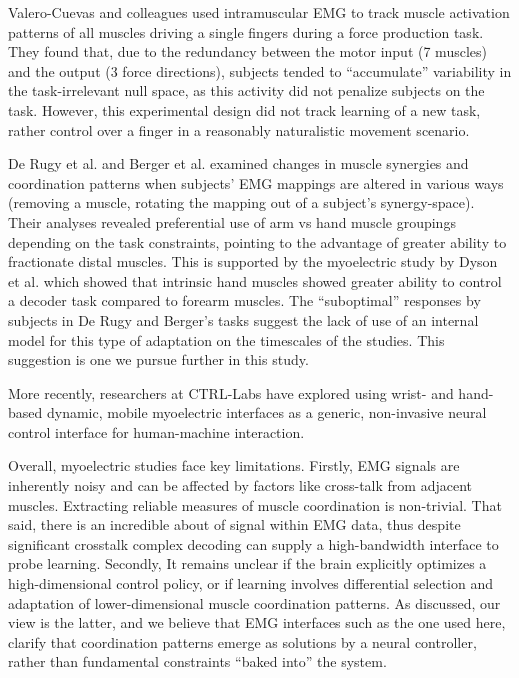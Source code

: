 \documentclass[../main.tex]{subfiles}
\begin{document}
Valero-Cuevas and colleagues\cite{Valero-Cuevas2009} used intramuscular EMG to track muscle activation patterns of all muscles driving a single fingers during a force production task. They found that, due to the redundancy between the motor input (7 muscles) and the output (3 force directions), subjects tended to ``accumulate'' variability in the task-irrelevant null space, as this activity did not penalize subjects on the task. However, this experimental design did not track learning of a new task, rather control over a finger in a reasonably naturalistic movement scenario.

De Rugy et al.\cite{derugyMuscleCoordinationHabitual2012} and Berger et al.\cite{BergerDifferencesInAdaptationRates2013a} examined changes in muscle synergies and coordination patterns when subjects' EMG mappings are altered in various ways (removing a muscle, rotating the mapping out of a subject's synergy-space). Their analyses revealed preferential use of arm vs hand muscle groupings depending on the task constraints, pointing to the advantage of greater ability to fractionate distal muscles. This is supported by the myoelectric study by Dyson et al.\cite{Dyson2018} which showed that intrinsic hand muscles showed greater ability to control a decoder task compared to forearm muscles. The ``suboptimal'' responses by subjects in De Rugy and Berger's tasks suggest the lack of use of an internal model for this type of adaptation on the timescales of the studies. This suggestion is one we pursue further in this study.

More recently, researchers at CTRL-Labs have explored using wrist- and hand-based dynamic, mobile myoelectric interfaces as a generic, non-invasive neural control interface for human-machine interaction\cite{ctrl-labsatrealitylabsGenericNoninvasiveNeuromotor2024}.

Overall, myoelectric studies face key limitations. Firstly, EMG signals are inherently noisy and can be affected by factors like cross-talk from adjacent muscles. Extracting reliable measures of muscle coordination is non-trivial. That said, there is an incredible about of signal within EMG data, thus despite significant crosstalk complex decoding can supply a high-bandwidth interface to probe learning. Secondly, It remains unclear if the brain explicitly optimizes a high-dimensional control policy, or if learning involves differential selection and adaptation of lower-dimensional muscle coordination patterns. As discussed, our view is the latter, and we believe that EMG interfaces such as the one used here, clarify that coordination patterns emerge as solutions by a neural controller, rather than fundamental constraints ``baked into'' the system.
\end{document}
